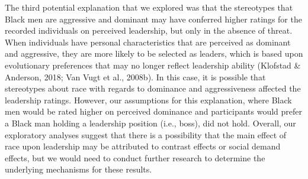 \documentclass[
  english,
  man]{apa6}
\begin{document}
The third potential explanation that we explored was that the stereotypes that Black men are aggressive and dominant may have conferred higher ratings for the recorded individuals on perceived leadership, but only in the absence of threat. When individuals have personal characteristics that are perceived as dominant and aggressive, they are more likely to be selected as leaders, which is based upon evolutionary preferences that may no longer reflect leadership ability (Klofstad \& Anderson, 2018; Van Vugt et al., 2008b). In this case, it is possible that stereotypes about race with regards to dominance and aggressiveness affected the leadership ratings. However, our assumptions for this explanation, where Black men would be rated higher on perceived dominance and participants would prefer a Black man holding a leadership position (i.e., boss), did not hold. Overall, our exploratory analyses suggest that there is a possibility that the main effect of race upon leadership may be attributed to contrast effects or social demand effects, but we would need to conduct further research to determine the underlying mechanisms for these results.
\end{document}
